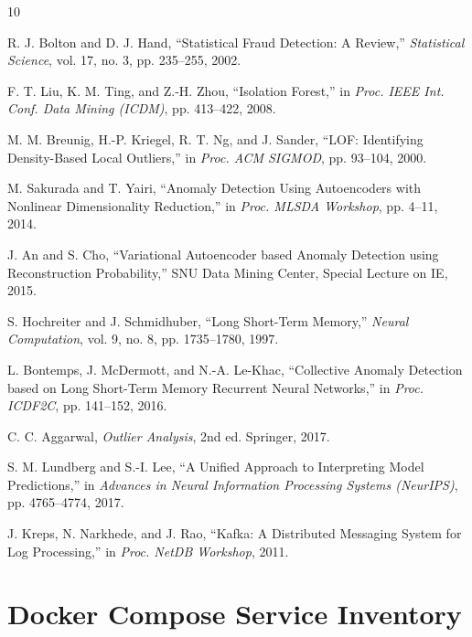 \documentclass[11pt,a4paper,oneside]{report}
\begin{document}
\begin{thebibliography}{10}

 R. J. Bolton and D. J. Hand, ``Statistical Fraud Detection: A Review,'' \emph{Statistical Science}, vol. 17, no. 3, pp. 235--255, 2002.

 F. T. Liu, K. M. Ting, and Z.-H. Zhou, ``Isolation Forest,'' in \emph{Proc. IEEE Int. Conf. Data Mining (ICDM)}, pp. 413--422, 2008.

 M. M. Breunig, H.-P. Kriegel, R. T. Ng, and J. Sander, ``LOF: Identifying Density-Based Local Outliers,'' in \emph{Proc. ACM SIGMOD}, pp. 93--104, 2000.

 M. Sakurada and T. Yairi, ``Anomaly Detection Using Autoencoders with Nonlinear Dimensionality Reduction,'' in \emph{Proc. MLSDA Workshop}, pp. 4--11, 2014.

 J. An and S. Cho, ``Variational Autoencoder based Anomaly Detection using Reconstruction Probability,'' SNU Data Mining Center, Special Lecture on IE, 2015.

 S. Hochreiter and J. Schmidhuber, ``Long Short-Term Memory,'' \emph{Neural Computation}, vol. 9, no. 8, pp. 1735--1780, 1997.

 L. Bontemps, J. McDermott, and N.-A. Le-Khac, ``Collective Anomaly Detection based on Long Short-Term Memory Recurrent Neural Networks,'' in \emph{Proc. ICDF2C}, pp. 141--152, 2016.

 C. C. Aggarwal, \emph{Outlier Analysis}, 2nd ed. Springer, 2017.

 S. M. Lundberg and S.-I. Lee, ``A Unified Approach to Interpreting Model Predictions,'' in \emph{Advances in Neural Information Processing Systems (NeurIPS)}, pp. 4765--4774, 2017.

 J. Kreps, N. Narkhede, and J. Rao, ``Kafka: A Distributed Messaging System for Log Processing,'' in \emph{Proc. NetDB Workshop}, 2011.

\end{thebibliography}

\appendix

\chapter{Docker Compose Service Inventory}

\end{document}
